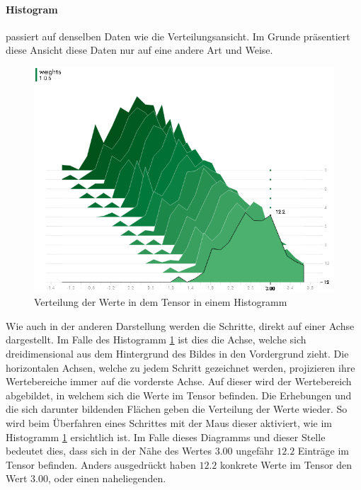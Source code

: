 

\paragraph{Histogram} passiert auf denselben Daten wie die Verteilungsansicht. 
Im Grunde präsentiert diese Ansicht diese Daten nur auf eine andere Art und Weise. 
\begin{figure}
	\centering
	\includegraphics[scale=0.7]{images/histogram-value.png}
	\caption{Verteilung der Werte in dem Tensor in einem Histogramm}
	\label{fig:Histogram}
\end{figure}
Wie auch in der anderen Darstellung werden die Schritte, direkt auf einer Achse dargestellt. 
Im Falle des Histogramm \ref{fig:Histogram} ist dies die Achse, welche sich dreidimensional aus dem Hintergrund des Bildes in den Vordergrund zieht. 
Die horizontalen Achsen, welche zu jedem Schritt gezeichnet werden, projizieren ihre Wertebereiche immer auf die vorderste Achse. 
Auf dieser wird der Wertebereich abgebildet, in welchem sich die Werte im Tensor befinden. 
Die Erhebungen und die sich darunter bildenden Flächen geben die Verteilung der Werte wieder. 
So wird beim Überfahren eines Schrittes mit der Maus dieser aktiviert, wie im Histogramm \ref{fig:Histogram} ersichtlich ist. 
Im Falle dieses Diagramms und dieser Stelle bedeutet dies, dass sich in der Nähe des Wertes $3.00$ ungefähr $12.2$ Einträge im Tensor befinden. 
Anders ausgedrückt haben $12.2$ konkrete Werte im Tensor den Wert $3.00$, oder einen naheliegenden. 
